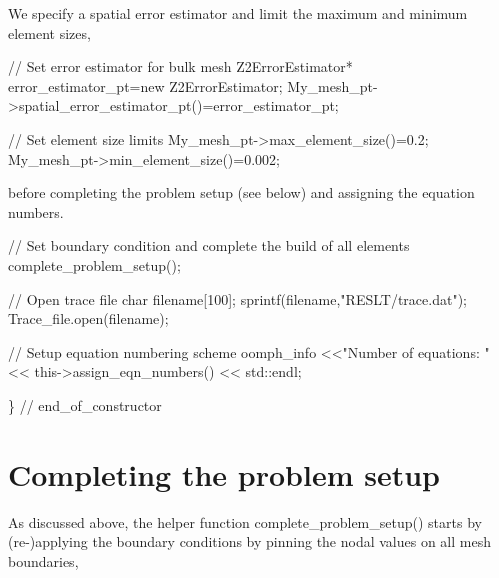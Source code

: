 We specify a spatial error estimator and limit the maximum and minimum element sizes,


\begin{DoxyCodeInclude}

 \textcolor{comment}{// Set error estimator for bulk mesh}
 Z2ErrorEstimator* error\_estimator\_pt=\textcolor{keyword}{new} Z2ErrorEstimator;
 My\_mesh\_pt->spatial\_error\_estimator\_pt()=error\_estimator\_pt;

 \textcolor{comment}{// Set element size limits}
 My\_mesh\_pt->max\_element\_size()=0.2;
 My\_mesh\_pt->min\_element\_size()=0.002; 

\end{DoxyCodeInclude}


before completing the problem setup (see below) and assigning the equation numbers.


\begin{DoxyCodeInclude}
 
 \textcolor{comment}{// Set boundary condition and complete the build of all elements}
 complete\_problem\_setup();

 \textcolor{comment}{// Open trace file}
 \textcolor{keywordtype}{char} filename[100];
 sprintf(filename,\textcolor{stringliteral}{"RESLT/trace.dat"});
 Trace\_file.open(filename);

 \textcolor{comment}{// Setup equation numbering scheme}
 oomph\_info <<\textcolor{stringliteral}{"Number of equations: "} 
            << this->assign\_eqn\_numbers() << std::endl;
 
\} \textcolor{comment}{// end\_of\_constructor}

\end{DoxyCodeInclude}




 

\hypertarget{index_complete}{}\section{Completing the problem setup}\label{index_complete}
As discussed above, the helper function {\ttfamily complete\+\_\+problem\+\_\+setup()} starts by (re-\/)applying the boundary conditions by pinning the nodal values on all mesh boundaries,


